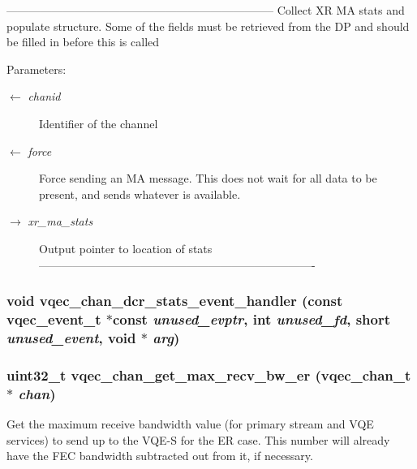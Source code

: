 ----------------------------------------------------------------------- Collect XR MA stats and populate structure. Some of the fields must be retrieved from the DP and should be filled in before this is called

\begin{Desc}
\item[Parameters:]
\begin{description}
\item[\mbox{$\leftarrow$} {\em chanid}]Identifier of the channel \item[\mbox{$\leftarrow$} {\em force}]Force sending an MA message. This does not wait for all data to be present, and sends whatever is available. \item[\mbox{$\rightarrow$} {\em xr\_\-ma\_\-stats}]Output pointer to location of stats ------------------------------------------------------------------------- \end{description}
\end{Desc}
\subsubsection{\setlength{\rightskip}{0pt plus 5cm}void vqec\_\-chan\_\-dcr\_\-stats\_\-event\_\-handler (const vqec\_\-event\_\-t $\ast$const  {\em unused\_\-evptr}, int {\em unused\_\-fd}, short {\em unused\_\-event}, void $\ast$ {\em arg})}\label{vqec__channel__private_8h_fa77ebd049ad6bed1f3d0362ca1cae9c}


\subsubsection{\setlength{\rightskip}{0pt plus 5cm}uint32\_\-t vqec\_\-chan\_\-get\_\-max\_\-recv\_\-bw\_\-er (\bf{vqec\_\-chan\_\-t} $\ast$ {\em chan})}\label{vqec__channel__private_8h_e11bfcadea4df3f9351885d9db79a162}


Get the maximum receive bandwidth value (for primary stream and VQE services) to send up to the VQE-S for the ER case. This number will already have the FEC bandwidth subtracted out from it, if necessary.

